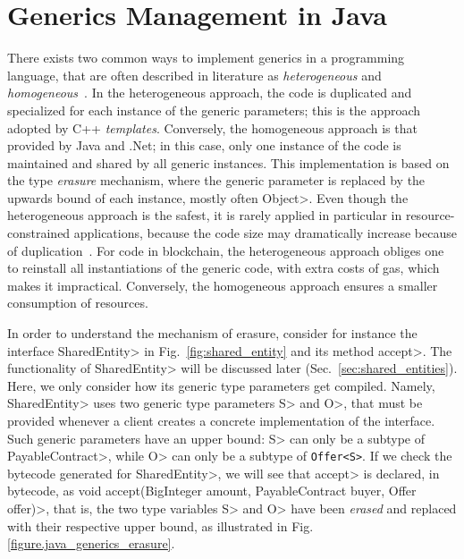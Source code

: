 \section{Generics Management in Java}\label{sec:java_generics}

There exists two common ways to implement generics in a programming language,
that are often described in literature as \emph{heterogeneous}
and \emph{homogeneous}~\cite{generics_categories}.
In the heterogeneous approach, the code is duplicated and specialized for each instance
of the generic parameters; this is the approach adopted by C++ \emph{templates}.
Conversely, the homogeneous approach is that provided by Java and .Net; in this case,
only one instance of the code is maintained and shared by all generic instances.
This implementation is based on the type \emph{erasure} mechanism, where the generic parameter
is replaced by the upwards bound of each instance, mostly often \<Object>.
Even though the heterogeneous approach is the safest, it is rarely applied in particular
in resource-constrained applications, because the code size may dramatically increase
because of duplication~\cite{generics_embedded_systems}. For code in blockchain,
the heterogeneous approach obliges one to reinstall all instantiations of the generic code,
with extra costs of gas, which makes it impractical.
Conversely, the homogeneous approach ensures a smaller consumption of resources.

In order to understand the mechanism of erasure, consider for instance
the interface \<SharedEntity> in Fig.~\ref{fig:shared_entity} and its method \<accept>.
The functionality of \<SharedEntity> will be discussed later (Sec.~\ref{sec:shared_entities}).
Here, we only consider how its generic type parameters get compiled.
Namely, \<SharedEntity> uses two generic type parameters \<S> and \<O>, that must be provided
whenever a client creates a concrete implementation of the interface.
Such generic parameters have an upper bound: \<S> can only be a subtype of \<PayableContract>,
while \<O> can only be a subtype of {\codesize\texttt{Offer<S>}}. If we check the bytecode
generated for \<SharedEntity>, we will see that \<accept> is declared, in bytecode, as
\<void accept(BigInteger amount, PayableContract buyer, Offer offer)>, that is,
the two type variables \<S> and \<O> have been \emph{erased} and replaced with their
respective upper bound, as illustrated in Fig.\,\ref{figure.java_generics_erasure}.

